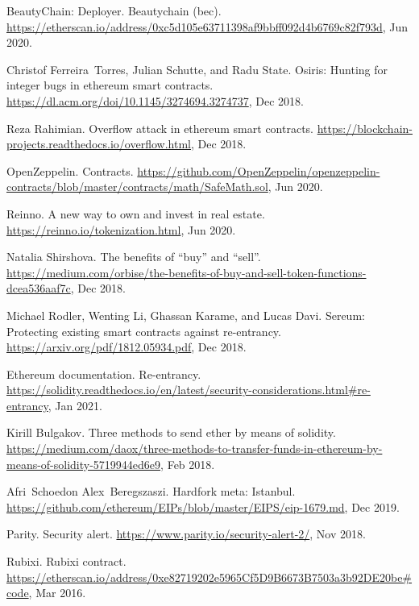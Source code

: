 \begin{thebibliography}{10}
BeautyChain: Deployer.
\newblock Beautychain (bec).
\newblock
  \url{https://etherscan.io/address/0xc5d105e63711398af9bbff092d4b6769c82f793d},
  Jun 2020.

Christof Ferreira~Torres, Julian Schutte, and Radu State.
\newblock Osiris: Hunting for integer bugs in ethereum smart contracts.
\newblock \url{https://dl.acm.org/doi/10.1145/3274694.3274737}, Dec 2018.

Reza Rahimian.
\newblock Overflow attack in ethereum smart contracts.
\newblock \url{https://blockchain-projects.readthedocs.io/overflow.html}, Dec
  2018.

OpenZeppelin.
\newblock Contracts.
\newblock
  \url{https://github.com/OpenZeppelin/openzeppelin-contracts/blob/master/contracts/math/SafeMath.sol},
  Jun 2020.

Reinno.
\newblock A new way to own and invest in real estate.
\newblock \url{https://reinno.io/tokenization.html}, Jun 2020.

Natalia Shirshova.
\newblock The benefits of ``buy'' and ``sell''.
\newblock
  \url{https://medium.com/orbise/the-benefits-of-buy-and-sell-token-functions-dcea536aaf7c},
  Dec 2018.

Michael Rodler, Wenting Li, Ghassan Karame, and Lucas Davi.
\newblock Sereum: Protecting existing smart contracts against re-entrancy.
\newblock \url{https://arxiv.org/pdf/1812.05934.pdf}, Dec 2018.

Ethereum documentation.
\newblock Re-entrancy.
\newblock
  \url{https://solidity.readthedocs.io/en/latest/security-considerations.html\#re-entrancy},
  Jan 2021.

Kirill Bulgakov.
\newblock Three methods to send ether by means of solidity.
\newblock
  \url{https://medium.com/daox/three-methods-to-transfer-funds-in-ethereum-by-means-of-solidity-5719944ed6e9},
  Feb 2018.

Afri~Schoedon Alex~Beregszaszi.
\newblock Hardfork meta: Istanbul.
\newblock \url{https://github.com/ethereum/EIPs/blob/master/EIPS/eip-1679.md},
  Dec 2019.

Parity.
\newblock Security alert.
\newblock \url{https://www.parity.io/security-alert-2/}, Nov 2018.

Rubixi.
\newblock Rubixi contract.
\newblock
  \url{https://etherscan.io/address/0xe82719202e5965Cf5D9B6673B7503a3b92DE20be#code},
  Mar 2016.


\end{thebibliography}
